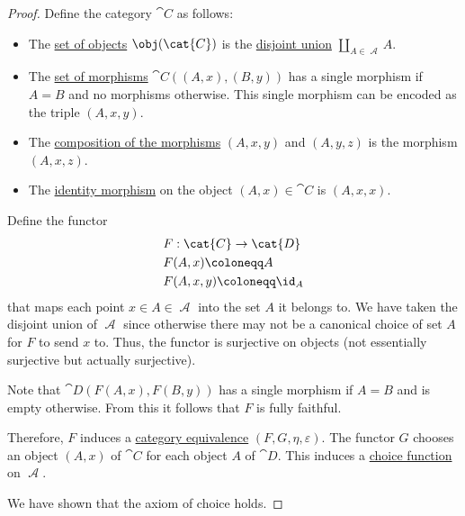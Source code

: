 \begin{proof}
  Define the category \( \cat{C} \) as follows:
  \begin{itemize}
    \item The \hyperref[def:category/objects]{set of objects} \( \obj(\cat{C}) \) is the \hyperref[def:disjoint_union]{disjoint union} \( \coprod_{A \in \mscrA} A \).

    \item The \hyperref[def:category/morphisms]{set of morphisms} \( \cat{C}((A, x), (B, y)) \) has a single morphism if \( A = B \) and no morphisms otherwise. This single morphism can be encoded as the triple \( (A, x, y) \).

    \item The \hyperref[def:category/composition]{composition of the morphisms} \( (A, x, y) \) and \( (A, y, z) \) is the morphism \( (A, x, z) \).

    \item The \hyperref[def:category/identity]{identity morphism} on the object \( (A, x) \in \cat{C} \) is \( (A, x, x) \).
  \end{itemize}

  Define the functor
  \begin{equation*}
    \begin{aligned}
      &F: \cat{C} \to \cat{D} \\
      &F(A, x) \coloneqq A \\
      &F(A, x, y) \coloneqq \id_A
    \end{aligned}
  \end{equation*}
  that maps each point \( x \in A \in \mscrA \) into the set \( A \) it belongs to. We have taken the disjoint union of \( \mscrA \) since otherwise there may not be a canonical choice of set \( A \) for \( F \) to send \( x \) to. Thus, the functor is surjective on objects (not essentially surjective but actually surjective).

  Note that \( \cat{D}(F(A, x), F(B, y)) \) has a single morphism if \( A = B \) and is empty otherwise. From this it follows that \( F \) is fully faithful.

  Therefore, \( F \) induces a \hyperref[def:category_equivalence]{category equivalence} \( (F, G, \eta, \varepsilon) \). The functor \( G \) chooses an object \( (A, x) \) of \( \cat{C} \) for each object \( A \) of \( \cat{D} \). This induces a \hyperref[def:choice_function]{choice function} on \( \mscrA \).

  We have shown that the axiom of choice holds.
\end{proof}

